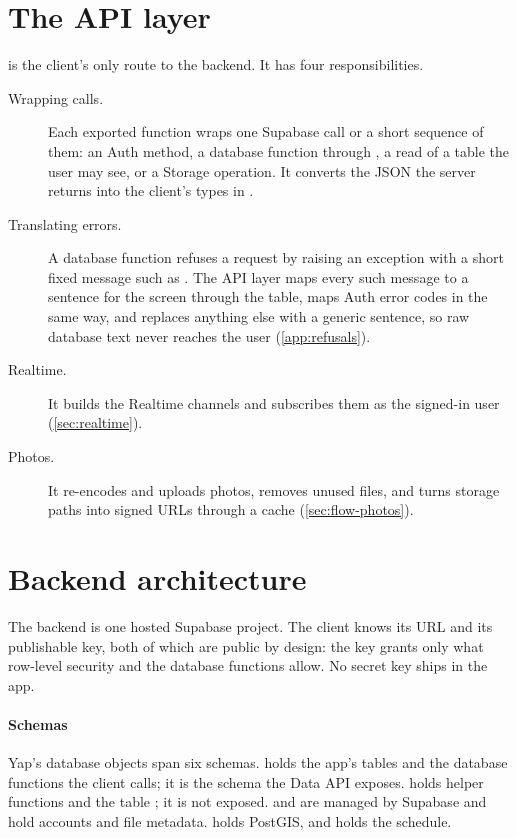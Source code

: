 \section{The API layer}
\label{sec:api-layer}

 is the client's only route to the backend. It has four responsibilities.

\begin{description}
  \item[Wrapping calls.] Each exported function wraps one Supabase call or a short sequence of them:
    an Auth method, a database function through , a read of a table the user may
    see, or a Storage operation. It converts the JSON the server returns into the client's types in
    .
  \item[Translating errors.] A database function refuses a request by raising an exception with a short
    fixed message such as . The API layer maps every such message to a sentence for
    the screen through the  table, maps Auth error codes in the same way, and
    replaces anything else with a generic sentence, so raw database text never reaches the user
    (\cref{app:refusals}).
  \item[Realtime.] It builds the Realtime channels and subscribes them as the signed-in user
    (\cref{sec:realtime}).
  \item[Photos.] It re-encodes and uploads photos, removes unused files, and turns storage paths into
    signed URLs through a cache (\cref{sec:flow-photos}).
\end{description}

\section{Backend architecture}
\label{sec:backend-architecture}

The backend is one hosted Supabase project. The client knows its URL and its publishable key, both of
which are public by design: the key grants only what row-level security and the database functions
allow. No secret key ships in the app.

\paragraph{Schemas} Yap's database objects span six schemas.  holds the app's tables and the
database functions the client calls; it is the schema the Data API exposes.  holds helper
functions and the table ; it is not exposed.  and  are
managed by Supabase and hold accounts and file metadata.  holds PostGIS, and
 holds the  schedule.

